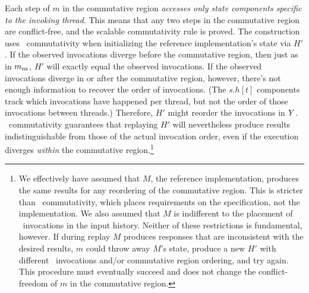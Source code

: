 \noindent%
Each step of $m$ in the commutative region \emph{accesses
only state components specific to the invoking thread}.
%
This means that any two steps in the commutative region are
conflict-free, and the scalable commutativity rule is proved.
%
The construction uses \SIM\ commutativity when initializing the
reference implementation's state via $H'$.
%
If the observed invocations diverge before the commutative region, then
just as in $m_{\text{ns}}$, $H'$ will exactly equal the observed invocations.
%
If the observed invocations diverge in or after the commutative region,
however, there's not enough information to recover the order of
invocations. (The $s.h[t]$ components track which invocations have
happened per thread, but not the order of those invocations between
threads.) Therefore, $H'$ might reorder the invocations in $Y$.
%
\SIM\ commutativity guarantees that replaying $H'$ will nevertheless produce
results indistinguishable from those of the actual invocation order,
even if the execution
diverges \emph{within} the commutative region.\footnote{%
  We effectively have assumed that $M$, the reference
  implementation, produces the same results for any reordering of the
  commutative region. This is stricter than \SIM\ commutativity, which
  places requirements on the {specification}, not the
  implementation. We also assumed that $M$ is indifferent to the
  placement of \CONTINUE\ invocations in
  the input history.  Neither of these restrictions is fundamental, however.  If
  during replay $M$ produces responses that are inconsistent with the
  desired results, $m$ could throw away $M$'s state, produce a new $H'$
  with different \CONTINUE\ invocations and/or commutative region ordering,
  and try again.
  This procedure must eventually succeed and does not change the
  conflict-freedom of $m$ in the commutative region.}

